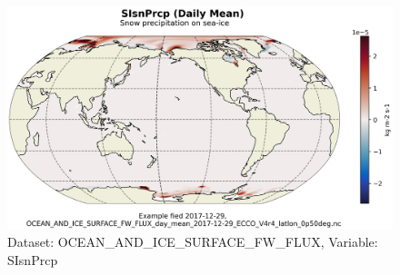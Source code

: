 \begin{figure}[H]
\centering
\includegraphics[scale=0.55]{../images/plots/latlon_plots/Ocean_and_Sea-Ice_Surface_Freshwater_Fluxes/SIsnPrcp.png}
\caption{Dataset: OCEAN\_AND\_ICE\_SURFACE\_FW\_FLUX, Variable: SIsnPrcp}
\label{tab:table-OCEAN_AND_ICE_SURFACE_FW_FLUX_SIsnPrcp-Plot}
\end{figure}
\pagebreak
